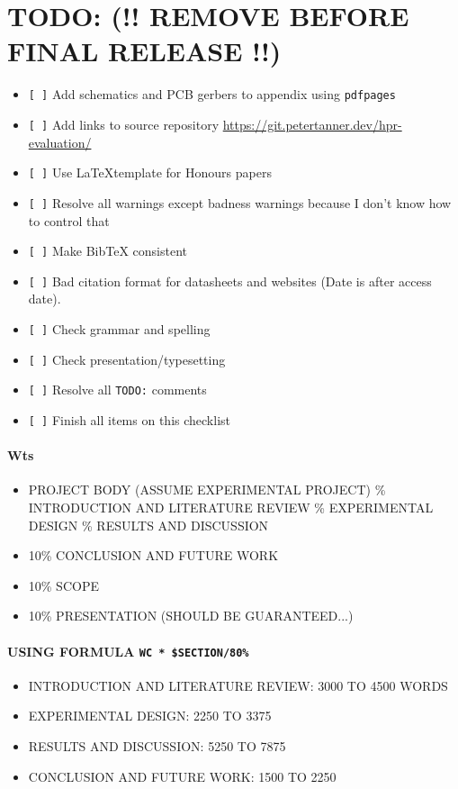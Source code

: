 \documentclass[a4paper,11pt]{article}
\begin{document}
\section{TODO: (!! REMOVE BEFORE FINAL RELEASE !!)}
\begin{itemize}
  \item \texttt{[ ]} Add schematics and PCB gerbers to appendix using \texttt{pdfpages}
  \item \texttt{[ ]} Add links to source repository \url{https://git.petertanner.dev/hpr-evaluation/}
  \item \texttt{[ ]} Use \LaTeX template for Honours papers
  \item \texttt{[ ]} Resolve all warnings except badness warnings because I don't know how to control that
  \item \texttt{[ ]} Make BibTeX consistent
  \item \texttt{[ ]} Bad citation format for datasheets and websites (Date is after access date).
  \item \texttt{[ ]} Check grammar and spelling
  \item \texttt{[ ]} Check presentation/typesetting
  \item \texttt{[ ]} Resolve all \texttt{TODO:} comments
  \item \texttt{[ ]} Finish all items on this checklist
\end{itemize}


\paragraph{Wts}
\begin{itemize}
  \item PROJECT BODY (ASSUME EXPERIMENTAL PROJECT)
        \% INTRODUCTION AND LITERATURE REVIEW
        \% EXPERIMENTAL DESIGN
        \% RESULTS AND DISCUSSION
  \item 10\% CONCLUSION AND FUTURE WORK
  \item 10\% SCOPE
  \item 10\% PRESENTATION (SHOULD BE GUARANTEED...)
\end{itemize}

\paragraph{USING FORMULA \texttt{WC * \$SECTION/80\%}}
\begin{itemize}
  \item INTRODUCTION AND LITERATURE REVIEW: 3000 TO 4500 WORDS
  \item EXPERIMENTAL DESIGN: 2250 TO 3375
  \item RESULTS AND DISCUSSION: 5250 TO 7875
  \item CONCLUSION AND FUTURE WORK: 1500 TO 2250
\end{itemize}
\end{document}
